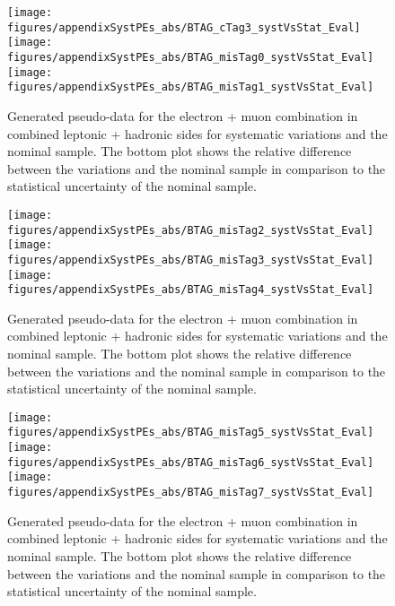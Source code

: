 \begin{figure}[!hb]
\begin{center}
        \texttt{[image: figures/appendixSystPEs\_abs/BTAG\_cTag3\_systVsStat\_Eval]}\\
        \texttt{[image: figures/appendixSystPEs\_abs/BTAG\_misTag0\_systVsStat\_Eval]}\\
        \texttt{[image: figures/appendixSystPEs\_abs/BTAG\_misTag1\_systVsStat\_Eval]}
  
        \caption{Generated pseudo-data for the electron + muon combination in combined leptonic + hadronic sides for systematic variations and the nominal \ttbar sample. The bottom plot shows the relative difference between the variations and the nominal sample in comparison to the statistical uncertainty of the nominal sample.}   
        \label{fig:systematicVar_lephad_Btag_2_2}
        \end{center}                          
        \end{figure}

\begin{figure}[!hb]
\begin{center}
        \texttt{[image: figures/appendixSystPEs\_abs/BTAG\_misTag2\_systVsStat\_Eval]}\\
        \texttt{[image: figures/appendixSystPEs\_abs/BTAG\_misTag3\_systVsStat\_Eval]}\\
        \texttt{[image: figures/appendixSystPEs\_abs/BTAG\_misTag4\_systVsStat\_Eval]}
  
        \caption{Generated pseudo-data for the electron + muon combination in combined leptonic + hadronic sides for systematic variations and the nominal \ttbar sample. The bottom plot shows the relative difference between the variations and the nominal sample in comparison to the statistical uncertainty of the nominal sample.}   
        \label{fig:systematicVar_lephad_Btag_3_1}
        \end{center}                          
        \end{figure}


\begin{figure}[!hb]
\begin{center}
        \texttt{[image: figures/appendixSystPEs\_abs/BTAG\_misTag5\_systVsStat\_Eval]}\\
        \texttt{[image: figures/appendixSystPEs\_abs/BTAG\_misTag6\_systVsStat\_Eval]}\\
        \texttt{[image: figures/appendixSystPEs\_abs/BTAG\_misTag7\_systVsStat\_Eval]}
  
        \caption{Generated pseudo-data for the electron + muon combination in combined leptonic + hadronic sides for systematic variations and the nominal \ttbar sample. The bottom plot shows the relative difference between the variations and the nominal sample in comparison to the statistical uncertainty of the nominal sample.}   
        \label{fig:systematicVar_lephad_Btag_3_2}
        \end{center}                          
        \end{figure}

